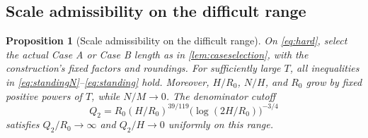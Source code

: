 \documentclass[11pt,reqno]{amsart}
\numberwithin{equation}{section}
\newtheorem{proposition}[proposition]{Proposition}
\theoremstyle{definition}
\theoremstyle{remark}
\begin{document}
\subsection{Scale admissibility on the difficult range}
\begin{proposition}[Scale admissibility on the difficult range]\label{prop:admissibility}
On \eqref{eq:hard}, select the actual Case A or Case B length as in \cref{lem:caseselection}, with the construction's fixed factors and roundings. For sufficiently large $T$, all inequalities in \eqref{eq:standingN}--\eqref{eq:standing} hold. Moreover, $H/R_0$, $N/H$, and $R_0$ grow by fixed positive powers of $T$, while $N/M\to0$. The denominator cutoff
\begin{equation}\label{eq:Q2}
 Q_2=R_0(H/R_0)^{39/119}\bigl(\log(2H/R_0)\bigr)^{-3/4}
\end{equation}
satisfies $Q_2/R_0\to\infty$ and $Q_2/H\to0$ uniformly on this range.
\end{proposition}
\end{document}
